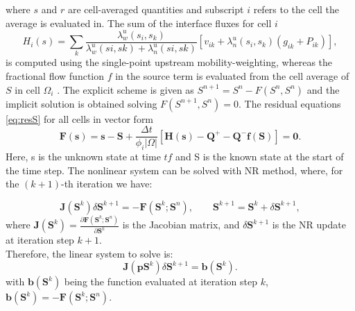 \documentclass[a4paper,10pt]{report}
\begin{document}
where $s$ and $r$ are cell-averaged quantities and subscript $i$ refers to
the cell the average is evaluated in. The sum of the interface fluxes for cell $i$ 
\begin{equation}
 H_i (s) =\sum_k \frac{\lambda^u_w (s_i , s_k )}{\lambda^u_w (si , sk ) + \lambda^u_n (si , sk )}[v_{ik} + \lambda^u_n (s_i , s_k )(g_{ik} + P_{ik} )],
\end{equation}
is computed using the single-point upstream mobility-weighting, whereas the fractional flow function $f$ in the source term
is evaluated from the cell average of $S$ in cell $\Omega_i$ . The explicit scheme is given
as $S^{n+1} = S^n −F(S^n , S^n )$ and the implicit solution is obtained solving $F(S^{n+1} , S^{ n}) = 0$. 
The residual equations \eqref{eq:resS} for all cells in vector form
\begin{equation}
 \mathbf{F} (\mathbf{s}) = \mathbf{s} − \mathbf{S} +\frac{\Delta t}{\phi_i|\Omega|}[\mathbf{H} (\mathbf{s}) − \mathbf{Q}^+ − \mathbf{Q}^-\mathbf{f} (\mathbf{S} )]=\mathbf{0}.
\end{equation}
Here, s is the unknown state at time $tf$ and S is the known state at the start
of the time step. The nonlinear system can be solved with NR method, where, for the $(k+1)$-th iteration we have:

$$\mathbf{J}(\mathbf{S}^k)\delta\mathbf{S}^{k+1}=-\mathbf{F}(\mathbf{S}^k;\mathbf{S}^n),
\qquad \mathbf{S}^{k+1}=\mathbf{S}^k+\delta \mathbf{S}^{k+1},$$
where $\mathbf{J}(\mathbf{S}^k)=\frac{\partial \mathbf{F}(\mathbf{S}^k;\mathbf{S}^n)}{\partial \mathbf{S}^k}$ is the 
Jacobian matrix, and $\delta \mathbf{S}^{k+1}$ is the NR update at iteration step $k+1$.\\
Therefore, the linear system to solve is:\\
\begin{equation}\label{eq:lsS}
\mathbf{J}(\mathbf{pS}^k)\delta \mathbf{S}^{k+1}=\mathbf{b}(\mathbf{S}^k).
\end{equation}
with $\mathbf{b}(\mathbf{S}^k)$ being the function evaluated at iteration step $k$, $\mathbf{b}(\mathbf{S}^k)=-\mathbf{F}(\mathbf{S}^k;\mathbf{S}^n)$.\\


\end{document}
